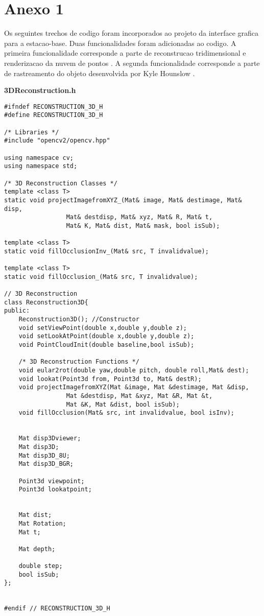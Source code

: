 \chapter{Anexo 1}
\label{Anexo1}

Os seguintes trechos de codigo foram incorporados ao projeto da interface grafica para a estacao-base. Duas funcionalidades foram adicionadas ao codigo. A primeira funcionalidade corresponde a parte de reconstrucao tridimensional e renderizacao da nuvem de pontos \cite{UEDA2011}. A segunda funcionalidade corresponde a parte de rastreamento do objeto desenvolvida por Kyle Hounslow \cite{Hounslow2013}. 


\lstset {language=C++}
\textbf{3DReconstruction.h}
\begin{lstlisting}[basicstyle=\tiny]
#ifndef RECONSTRUCTION_3D_H
#define RECONSTRUCTION_3D_H

/* Libraries */
#include "opencv2/opencv.hpp"

using namespace cv;
using namespace std;

/* 3D Reconstruction Classes */
template <class T>
static void projectImagefromXYZ_(Mat& image, Mat& destimage, Mat& disp, 
				 Mat& destdisp, Mat& xyz, Mat& R, Mat& t, 
				 Mat& K, Mat& dist, Mat& mask, bool isSub);

template <class T>
static void fillOcclusionInv_(Mat& src, T invalidvalue);

template <class T>
static void fillOcclusion_(Mat& src, T invalidvalue);

// 3D Reconstruction
class Reconstruction3D{
public:
    Reconstruction3D(); //Constructor
    void setViewPoint(double x,double y,double z);
    void setLookAtPoint(double x,double y,double z);
    void PointCloudInit(double baseline,bool isSub);

    /* 3D Reconstruction Functions */
    void eular2rot(double yaw,double pitch, double roll,Mat& dest);
    void lookat(Point3d from, Point3d to, Mat& destR);
    void projectImagefromXYZ(Mat &image, Mat &destimage, Mat &disp, 
			     Mat &destdisp, Mat &xyz, Mat &R, Mat &t,
			     Mat &K, Mat &dist, bool isSub);
    void fillOcclusion(Mat& src, int invalidvalue, bool isInv);


    Mat disp3Dviewer;
    Mat disp3D;
    Mat disp3D_8U;
    Mat disp3D_BGR;

    Point3d viewpoint;
    Point3d lookatpoint;


    Mat dist;
    Mat Rotation;
    Mat t;

    Mat depth;

    double step;
    bool isSub;
};


#endif // RECONSTRUCTION_3D_H
\end{lstlisting}


